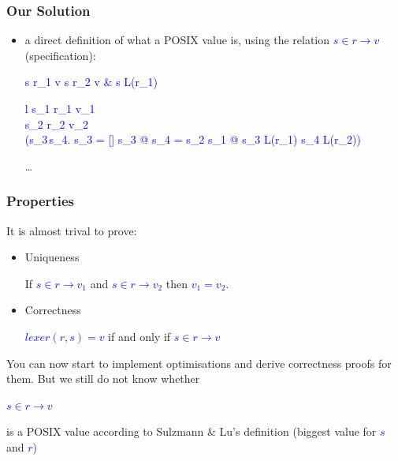 \documentclass[dvipsnames,14pt,t]{beamer}
\newcommand{\bl}[1]{\textcolor{blue}{#1}}
\begin{document}
\begin{frame}[c]
\frametitle{Our Solution}

\begin{itemize}
\item a direct definition of what a POSIX value is, using
the relation \bl{$s \in r \to v$} (specification):\medskip

\begin{center}
\bl{}\hspace{15mm}
\bl{}\bigskip\medskip

\bl{
          {s \in r_1 \to v}}\hspace{10mm}
\bl{
          {s \in r_2 \to v & s \not\in L(r_1)}}\bigskip\medskip

\bl{
          {\small\begin{array}{l}
           s_1 \in r_1 \to v_1 \\
           s_2 \in r_2 \to v_2 \\
           \neg(\exists s_3\,s_4.\; s_3 \not= []
           \wedge s_3 @ s_4 = s_2 \wedge
           s_1 @ s_3 \in L(r_1) \wedge
           s_4 \in L(r_2))
           \end{array}}}
           
\bl{\ldots}           
\end{center}
\end{itemize}

\end{frame}

\begin{frame}[c]
\frametitle{Properties}

It is almost trival to prove:

\begin{itemize}
\item Uniqueness
\begin{center}
If \bl{$s \in r \to v_1$} and \bl{$s \in r \to v_2$} then
\bl{$v_1 = v_2$}.
\end{center}\bigskip

\item Correctness
\begin{center}
\bl{$lexer(r, s) = v$} if and only if \bl{$s \in r \to v$}
\end{center}
\end{itemize}\bigskip\bigskip\pause


You can now start to implement optimisations and derive
correctness proofs for them. But we still do not know whether

\begin{center}
\bl{$s \in r \to v$} 
\end{center}

is a POSIX value according to Sulzmann \& Lu's definition
(biggest value for \bl{$s$} and \bl{$r$})
\end{frame}
\end{document}
